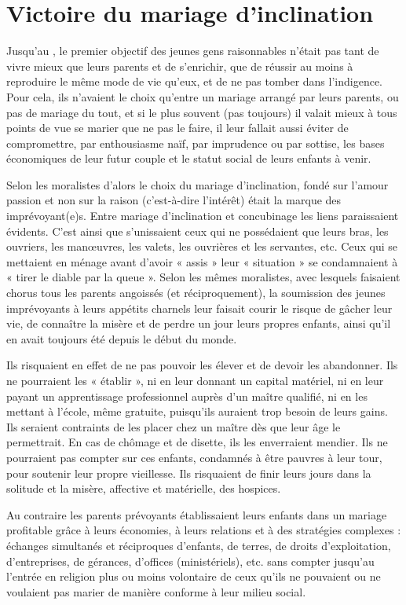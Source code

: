 
\chapter{Victoire du mariage d'inclination}


 Jusqu'au , le premier objectif des jeunes gens raisonnables n'était pas tant de vivre mieux que leurs parents et de s'enrichir, que de réussir au moins à reproduire le même mode de vie qu'eux, et de ne pas tomber dans l'indigence. Pour cela, ils n'avaient le choix qu'entre un mariage arrangé par leurs parents, ou pas de mariage du tout, et si le plus souvent (pas toujours) il valait mieux à tous points de vue se marier que ne pas le faire, il leur fallait aussi éviter de compromettre, par enthousiasme naïf, par imprudence ou par sottise, les bases économiques de leur futur couple et le statut social de leurs enfants à venir. 

 Selon les moralistes d'alors le choix du mariage d'inclination, fondé sur l'amour passion et non sur la raison (c'est-à-dire l'intérêt) était la marque des imprévoyant(e)s. Entre mariage d'inclination et concubinage les liens paraissaient évidents. C'est ainsi que s'unissaient ceux qui ne possédaient que leurs bras, les ouvriers, les manœuvres, les valets, les ouvrières et les servantes, etc. Ceux qui se mettaient en ménage avant d'avoir « assis » leur « situation » se condamnaient à « tirer le diable par la queue ». Selon les mêmes moralistes, avec lesquels faisaient chorus tous les parents angoissés (et réciproquement), la soumission des jeunes imprévoyants à leurs appétits charnels leur faisait courir le risque de gâcher leur vie, de connaître la misère et de perdre un jour leurs propres enfants, ainsi qu'il en avait toujours été depuis le début du monde. 

 Ils risquaient en effet de ne pas pouvoir les élever et de devoir les abandonner. Ils ne pourraient les « établir », ni en leur donnant un capital matériel, ni en leur payant un apprentissage professionnel auprès d'un maître qualifié, ni en les mettant à l'école, même gratuite, puisqu'ils auraient trop besoin de leurs gains. Ils seraient contraints de les placer chez un maître dès que leur âge le permettrait. En cas de chômage et de disette, ils les enverraient mendier. Ils ne pourraient pas compter sur ces enfants, condamnés à être pauvres à leur tour, pour soutenir leur propre vieillesse. Ils risquaient de finir leurs jours dans la solitude et la misère, affective et matérielle, des hospices.

 Au contraire les parents prévoyants établissaient leurs enfants dans un mariage profitable grâce à leurs économies, à leurs relations et à des stratégies complexes : échanges simultanés et réciproques d'enfants, de terres, de droits d'exploitation, d'entreprises, de gérances, d'offices (ministériels), etc. sans compter jusqu'au  l'entrée en religion plus ou moins volontaire de ceux qu'ils ne pouvaient ou ne voulaient pas marier de manière conforme à leur milieu social. 

